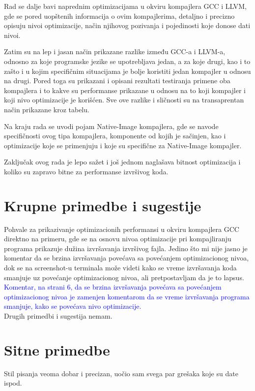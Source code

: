 \documentclass[a4paper]{report}
\newcommand{\odgovor}[1]{\textcolor{blue}{#1}}
\begin{document}
Rad se dalje bavi naprednim optimizacijama u okviru kompajlera GCC i LLVM, gde se pored uopštenih informacija o ovim kompajlerima, detaljno i precizno opisuju nivoi optimizacije, način njihovog pozivanja i pojedinosti koje donose dati nivoi. 

Zatim su na lep i jasan način prikazane razlike između GCC-a i LLVM-a, odnosno za koje programske jezike se upotrebljava jedan, a za koje drugi, kao i to zašto i u kojim specifičnim situacijama je bolje koristiti jedan kompajler u odnosu na drugi. Pored toga su prikazani i opisani rezultati testiranja primene oba kompajlera i to kakve su performanse prikazane u odnosu na to koji kompajler i koji nivo optimizacije je korišćen.
Sve ove razlike i sličnosti su na transaprentan način prikazane kroz tabelu.

Na kraju rada se uvodi pojam Native-Image kompajlera, gde se navode specifičnosti ovog tipa kompajlera, komponente od kojih je sačinjen, kao i optimizacije koje se primenjuju i koje su specifične za Native-Image kompajler.

Zaključak ovog rada je lepo sažet i još jednom naglašava bitnost optimizacija i koliko su zapravo bitne za performanse izvršivog koda.


\section{Krupne primedbe i sugestije}
Pohvale za prikazivanje optimizacionih performansi u okviru kompajlera GCC direktno na primeru, gde se na osnovu nivoa optimizacije pri kompajliranju programa prikazuje dužina izvršavanja izvršivog fajla. Jedino što mi nije jasno je komentar da se brzina izvršavanja povećava sa povećanjem optimizacionog nivoa, dok se na screenshot-u terminala može videti kako se vreme izvršavanja koda smanjuje uz povećanje optimizacionog nivoa, ali pretpostavljam da je to lapsus. \odgovor{Komentar, na strani 6, da se brzina izvršavanja povećava sa povećanjem optimizacionog nivoa je zamenjen komentarom da se vreme izvršavanja programa smanjuje, kako se povećava nivo optimizacije. } \\
Drugih primedbi i sugestija nemam.

\section{Sitne primedbe}
Stil pisanja veoma dobar i precizan, uočio sam svega par grešaka koje su date ispod.
\end{document}
